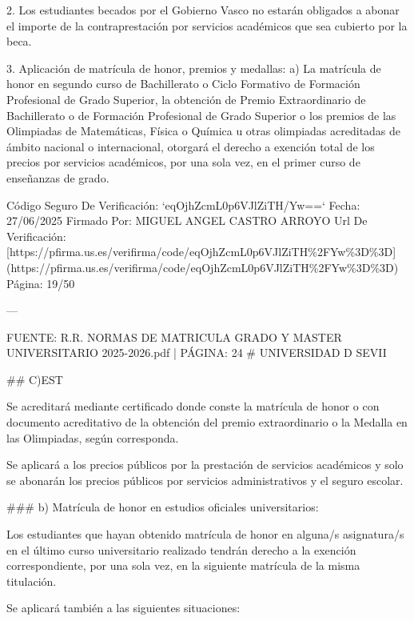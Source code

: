 \documentclass{article}
\begin{document}
\begin{itemize}
\begin{itemize}
\begin{scriptsize}
                  2. Los estudiantes becados por el Gobierno Vasco no estarán obligados a abonar el importe de la contraprestación por servicios académicos que sea cubierto por la beca.

                  3. Aplicación de matrícula de honor, premios y medallas:
                  a) La matrícula de honor en segundo curso de Bachillerato o Ciclo Formativo de Formación Profesional de Grado Superior, la obtención de Premio Extraordinario de Bachillerato o de Formación Profesional de Grado Superior o los premios de las Olimpiadas de Matemáticas, Física o Química u otras olimpiadas acreditadas de ámbito nacional o internacional, otorgará el derecho a exención total de los precios por servicios académicos, por una sola vez, en el primer curso de enseñanzas de grado.

                  Código Seguro De Verificación: `eqOjhZcmL0p6VJlZiTH/Yw==`
                  Fecha: 27/06/2025
                  Firmado Por: MIGUEL ANGEL CASTRO ARROYO
                  Url De Verificación: [https://pfirma.us.es/verifirma/code/eqOjhZcmL0p6VJlZiTH\%2FYw\%3D\%3D](https://pfirma.us.es/verifirma/code/eqOjhZcmL0p6VJlZiTH\%2FYw\%3D\%3D)
                  Página: 19/50

                  ---

                  FUENTE: R.R. NORMAS DE MATRICULA GRADO Y MASTER UNIVERSITARIO 2025-2026.pdf | PÁGINA: 24
                  \# UNIVERSIDAD D SEVII

                  \#\# C)EST

                  Se acreditará mediante certificado donde conste la matrícula de honor o con documento acreditativo de la obtención del premio extraordinario o la Medalla en las Olimpiadas, según corresponda.

                  Se aplicará a los precios públicos por la prestación de servicios académicos y solo se abonarán los precios públicos por servicios administrativos y el seguro escolar.

                  \#\#\# b) Matrícula de honor en estudios oficiales universitarios:

                  Los estudiantes que hayan obtenido matrícula de honor en alguna/s asignatura/s en el último curso universitario realizado tendrán derecho a la exención correspondiente, por una sola vez, en la siguiente matrícula de la misma titulación.

                  Se aplicará también a las siguientes situaciones:


\end{scriptsize}
\end{itemize}
\end{itemize}
\end{document}
